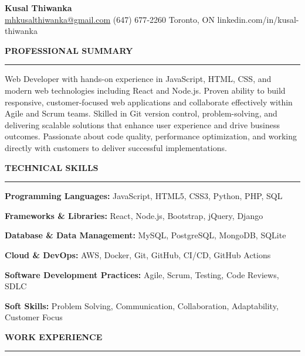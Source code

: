 \documentclass[10pt,letterpaper]{article}
\begin{document}
\begin{center}
{\LARGE\textbf{Kusal Thiwanka}}\\[3pt]
\href{mailto:mhkusalthiwanka@gmail.com}{mhkusalthiwanka@gmail.com}\hspace{2em}%
(647) 677{-}2260\hspace{2em}%
Toronto, ON\hspace{2em}
linkedin.com/in/kusal-thiwanka
\end{center}

\vspace{6pt}

\textbf{PROFESSIONAL SUMMARY}\\[-8pt]
\noindent\rule{\textwidth}{1pt}

\vspace{-2pt}

Web Developer with hands-on experience in JavaScript, HTML, CSS, and modern web technologies including React and Node.js. Proven ability to build responsive, customer-focused web applications and collaborate effectively within Agile and Scrum teams. Skilled in Git version control, problem-solving, and delivering scalable solutions that enhance user experience and drive business outcomes. Passionate about code quality, performance optimization, and working directly with customers to deliver successful implementations.

\vspace{8pt}

\textbf{TECHNICAL SKILLS}\\[-8pt]
\noindent\rule{\textwidth}{1pt}

\vspace{-2pt}

\textbf{Programming Languages:} JavaScript, HTML5, CSS3, Python, PHP, SQL

\textbf{Frameworks \& Libraries:} React, Node.js, Bootstrap, jQuery, Django

\textbf{Database \& Data Management:} MySQL, PostgreSQL, MongoDB, SQLite

\textbf{Cloud \& DevOps:} AWS, Docker, Git, GitHub, CI/CD, GitHub Actions

\textbf{Software Development Practices:} Agile, Scrum, Testing, Code Reviews, SDLC

\textbf{Soft Skills:} Problem Solving, Communication, Collaboration, Adaptability, Customer Focus

\vspace{8pt}

\textbf{WORK EXPERIENCE}\\[-8pt]
\noindent\rule{\textwidth}{1pt}
\end{document}
